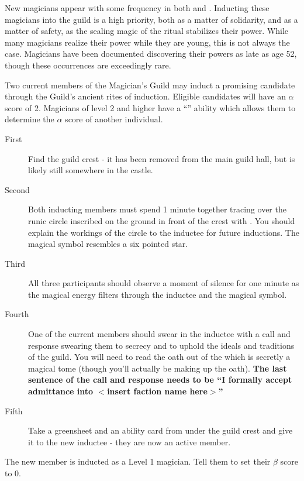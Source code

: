 \documentclass[green]{NeptuneBall}
\begin{document}
\name{\gInduction{}}

New magicians appear with some frequency in both \pPacifica{} and \pAtlantis{}. Inducting these magicians into the guild is a high priority, both as a matter of solidarity, and as a matter of safety, as the sealing magic of the ritual stabilizes their power. While many magicians realize their power while they are young, this is not always the case. Magicians have been documented discovering their powers as late as age 52, though these occurrences are exceedingly rare.

Two current members of the Magician's Guild may induct a promising candidate through the Guild's ancient rites of induction. Eligible candidates will have an $\alpha$ score of 2. Magicians of level 2 and higher have a ``\aPerceive{}'' ability which allows them to determine the $\alpha$ score of another individual.
\begin{description}
\item[First] Find the guild crest - it has been removed from the main guild hall, but is likely still somewhere in the castle. 
\item[Second] Both inducting members must spend 1 minute together tracing over the runic circle inscribed on the ground in front of the crest with \iChalk{}. You should explain the workings of the circle to the inductee for future inductions. The magical symbol resembles a six pointed star. 
\item[Third] All three participants should observe a moment of silence for one minute as the magical energy filters through the inductee and the magical symbol. 
\item[Fourth] One of the current members should swear in the inductee with a call and response swearing them to secrecy and to uphold the ideals and traditions of the guild. You will need to read the oath out of the \iBook{} which is secretly a magical tome (though you'll actually be making up the oath). {\bf The last sentence of the call and response needs to be ``I formally accept admittance into $<$insert faction name here$>$''}
\item[Fifth] Take a greensheet and an ability card from under the guild crest and give it to the new inductee - they are now an active member.
\end{description}

The new member is inducted as a Level 1 magician. Tell them to set their $\beta$ score to 0.
\end{document}
